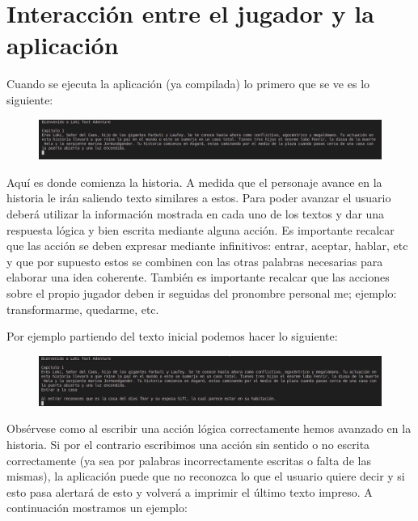 \documentclass[12pt]{article}
\begin{document}
\section{Interacci\'on entre el jugador y la aplicaci\'on}

Cuando se ejecuta la aplicaci\'on (ya compilada) lo primero que se ve es lo siguiente:

\begin{figure}[h]
	\begin{center}
		\includegraphics[width =15.0cm]{Inicial.png}
	\end{center}
\end{figure}

Aqu\'i es donde comienza la historia. A medida que el personaje avance en la historia le ir\'an saliendo texto similares a estos. Para poder avanzar el usuario deber\'a utilizar la informaci\'on mostrada en cada uno de los textos y dar una respuesta l\'ogica y bien escrita mediante alguna acci\'on. Es importante recalcar que las acci\'on se deben expresar mediante infinitivos: entrar, aceptar, hablar, etc y que por supuesto estos se combinen con las otras palabras necesarias para elaborar una idea coherente. Tambi\'en es importante recalcar que las acciones sobre el propio jugador deben ir seguidas del pronombre personal me; ejemplo: transformarme, quedarme, etc.

Por ejemplo partiendo del texto inicial podemos hacer lo siguiente:
\begin{figure}[h]
	\begin{center}
		\includegraphics[width =15.0cm]{Avance.png}
	\end{center}
\end{figure}

Obs\'ervese como al escribir una acci\'on l\'ogica correctamente hemos avanzado en la historia. Si por el contrario escribimos una acci\'on sin sentido o no escrita correctamente (ya sea por palabras incorrectamente escritas o falta de las mismas), la aplicaci\'on puede que no reconozca lo que el usuario quiere decir y si esto pasa alertar\'a de esto y volver\'a a imprimir el \'ultimo texto impreso. A continuaci\'on mostramos un ejemplo:
\end{document}
